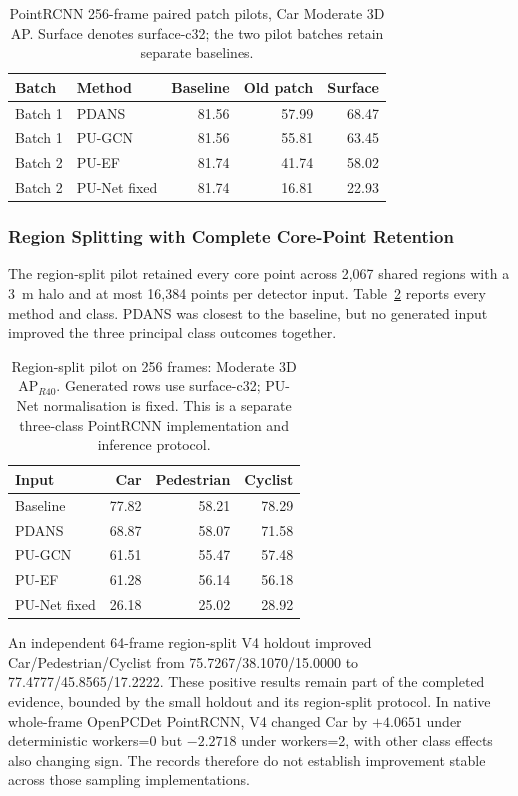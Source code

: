 \begin{table}[!t]\centering\setlength{\tabcolsep}{4pt}
\begin{tabular}{llrrr}\toprule
Batch & Method & Baseline & Old patch & Surface\\\midrule
Batch 1 & PDANS & 81.56 & 57.99 & 68.47\\
Batch 1 & PU-GCN & 81.56 & 55.81 & 63.45\\
Batch 2 & PU-EF & 81.74 & 41.74 & 58.02\\
Batch 2 & PU-Net fixed & 81.74 & 16.81 & 22.93\\
\bottomrule\end{tabular}
\caption{PointRCNN 256-frame paired patch pilots, Car Moderate 3D AP. Surface denotes surface-c32; the two pilot batches retain separate baselines.}\label{tab:k-patch-pairs}\end{table}

\subsubsection{Region Splitting with Complete Core-Point Retention}
The region-split pilot retained every core point across 2,067 shared
regions with a 3~m halo and at most 16,384 points per detector input.
Table~\ref{tab:k-region-all} reports every method and class.
PDANS was closest to the baseline, but no generated input improved
the three principal class outcomes together.

\begin{table}[!t]\centering\setlength{\tabcolsep}{4pt}
\begin{tabular}{lrrr}\toprule
Input & Car & Pedestrian & Cyclist\\\midrule
Baseline & 77.82 & 58.21 & 78.29\\
PDANS & 68.87 & 58.07 & 71.58\\
PU-GCN & 61.51 & 55.47 & 57.48\\
PU-EF & 61.28 & 56.14 & 56.18\\
PU-Net fixed & 26.18 & 25.02 & 28.92\\
\bottomrule\end{tabular}
\caption{Region-split pilot on 256 frames: Moderate 3D AP$_{R40}$. Generated rows use surface-c32; PU-Net normalisation is fixed. This is a separate three-class PointRCNN implementation and inference protocol.}\label{tab:k-region-all}\end{table}

An independent 64-frame region-split V4 holdout improved
Car/Pedestrian/Cyclist from 75.7267/38.1070/15.0000 to
77.4777/45.8565/17.2222. These positive results remain part of the
completed evidence, bounded by the small holdout and its region-split
protocol. In native whole-frame OpenPCDet PointRCNN, V4 changed Car
by $+4.0651$ under deterministic workers=0 but $-2.2718$ under
workers=2, with other class effects also changing sign. The records
therefore do not establish improvement stable across those sampling
implementations.

